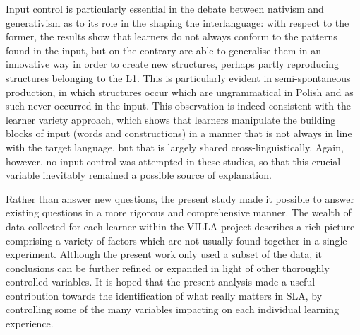 Input control is particularly essential in the debate between nativism and generativism as to its role in the shaping the interlanguage: with respect to the former, the results show that learners do not always conform to the patterns found in the input, but on the contrary are able to generalise them in an innovative way in order to create new structures, perhaps partly reproducing structures belonging to the L1. This is particularly evident in semi-spontaneous production, in which structures occur which are ungrammatical in Polish and as such never occurred in the input. This observation is indeed consistent with the learner variety approach, which shows that learners manipulate the building blocks of input (words and constructions) in a manner that is not always in line with the target language, but that is largely shared cross-linguistically. Again, however, no input control was attempted in these studies, so that this crucial variable inevitably remained a possible source of explanation.

Rather than answer new questions, the present study made it possible to answer existing questions in a more rigorous and comprehensive manner. The wealth of data collected for each learner within the VILLA project describes a rich picture comprising a variety of factors which are not usually found together in a single experiment. Although the present work only used a subset of the data, it conclusions can be further refined or expanded in light of other thoroughly controlled variables. It is hoped that the present analysis made a useful contribution towards the identification of what really matters in SLA, by controlling some of the many variables impacting on each individual learning experience.
